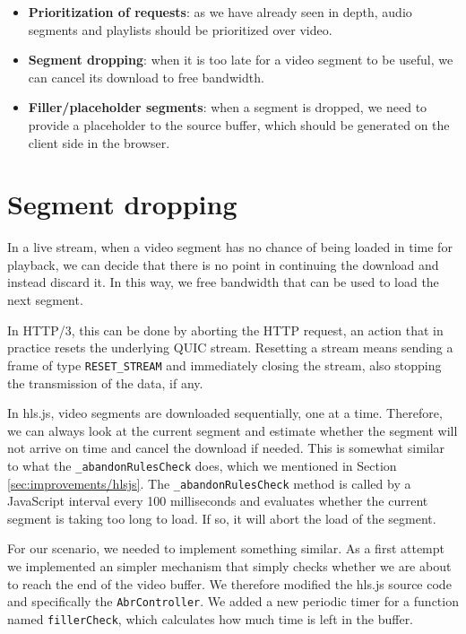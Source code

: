 \begin{itemize}
    \item \textbf{Prioritization of requests}: as we have already seen in depth, audio segments and playlists should be prioritized over video.
    \item \textbf{Segment dropping}: when it is too late for a video segment to be useful, we can cancel its download to free bandwidth.
    \item \textbf{Filler/placeholder segments}: when a segment is dropped, we need to provide a placeholder to the source buffer, which should be generated on the client side in the browser.
\end{itemize}

\section{Segment dropping}
\label{sec:improvements/dropping}

In a live stream, when a video segment has no chance of being loaded in time for playback, we can decide that there is no point in continuing the download and instead discard it. In this way, we free bandwidth that can be used to load the next segment.

In HTTP/3, this can be done by aborting the HTTP request, an action that in practice resets the underlying QUIC stream. Resetting a stream means sending a frame of type \texttt{RESET\_STREAM} and immediately closing the stream, also stopping the transmission of the data, if any.

In hls.js, video segments are downloaded sequentially, one at a time. Therefore, we can always look at the current segment and estimate whether the segment will not arrive on time and cancel the download if needed. This is somewhat similar to what the \texttt{\_abandonRulesCheck} does, which we mentioned in Section \ref{sec:improvements/hlsjs}. The \texttt{\_abandonRulesCheck} method is called by a JavaScript interval every 100 milliseconds and evaluates whether the current segment is taking too long to load. If so, it will abort the load of the segment.

For our scenario, we needed to implement something similar. As a first attempt we implemented an simpler mechanism that simply checks whether we are about to reach the end of the video buffer. We therefore modified the hls.js source code and specifically the \texttt{AbrController}. We added a new periodic timer for a function named \texttt{fillerCheck}, which calculates how much time is left in the buffer.

